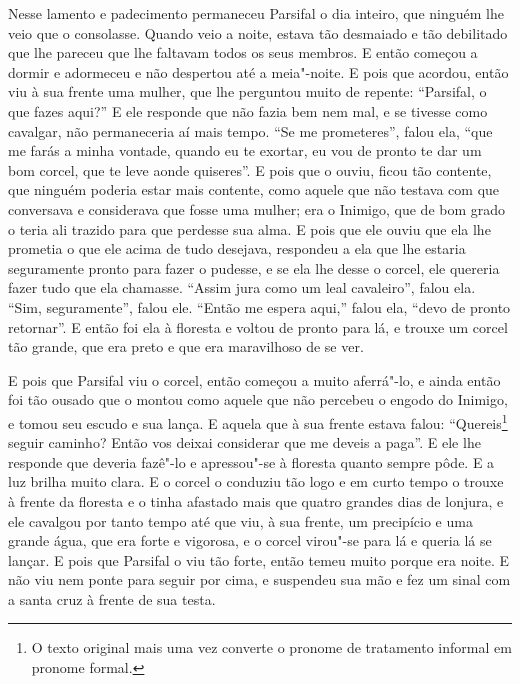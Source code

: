 Nesse lamento e padecimento permaneceu Parsifal o dia inteiro, que ninguém
lhe veio que o consolasse. Quando veio a noite, estava tão desmaiado e tão
debilitado que lhe pareceu que lhe faltavam todos os seus membros. E então
começou a dormir e adormeceu e não despertou até a meia"-noite. E pois que
acordou, então viu à sua frente uma mulher, que lhe perguntou muito de repente:
“Parsifal, o que fazes aqui?” E ele responde que não fazia bem nem mal, e se
tivesse como cavalgar, não permaneceria aí mais tempo. “Se me prometeres”,
falou ela, “que me farás a minha vontade, quando eu te exortar, eu vou de
pronto te dar um bom corcel, que te leve aonde quiseres”. E pois que o ouviu,
ficou tão contente, que ninguém poderia estar mais contente, como aquele que
não testava com que conversava e considerava que fosse uma mulher; era o
Inimigo, que de bom grado o teria ali trazido para que perdesse sua alma. E
pois que ele ouviu que ela lhe prometia o que ele acima de tudo desejava,
respondeu a ela que lhe estaria seguramente pronto para fazer o pudesse, e se
ela lhe desse o corcel, ele quereria fazer tudo que ela chamasse. “Assim jura
como um leal cavaleiro”, falou ela. “Sim, seguramente”, falou ele. “Então me
espera aqui,” falou ela, “devo de pronto retornar”. E então foi ela à floresta
e voltou de pronto para lá, e trouxe um corcel tão grande, que era preto e que
era maravilhoso de se ver.

E pois que Parsifal viu o corcel, então começou a muito aferrá"-lo, e ainda
então foi tão ousado que o montou como aquele que não percebeu o engodo do
Inimigo, e tomou seu escudo e sua lança. E aquela que à sua frente estava
falou: “Quereis\footnote{ O texto original mais uma vez converte o pronome de
tratamento informal em pronome formal.}  seguir caminho? Então vos
deixai considerar que me deveis a paga”. E ele lhe responde que deveria
fazê"-lo e apressou"-se à floresta quanto sempre pôde. E a luz brilha muito
clara. E o corcel o conduziu tão logo e em curto tempo o trouxe à frente da
floresta e o tinha afastado mais que quatro grandes dias de lonjura, e ele
cavalgou por tanto tempo até que viu, à sua frente, um precipício e uma grande
água, que era forte e vigorosa, e o corcel virou"-se para lá e queria lá se
lançar. E pois que Parsifal o viu tão forte, então temeu muito porque era
noite. E não viu nem ponte para seguir por cima, e suspendeu sua mão e fez um
sinal com a santa cruz à frente de sua testa.

